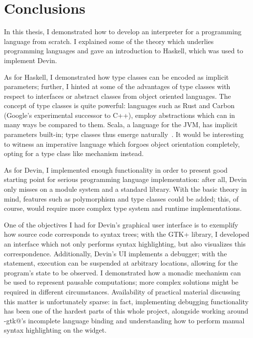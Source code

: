 \documentclass[UdineBachThesis,american,11pt]{PhdThesis}
\begin{document}
  \chapter{Conclusions}

  In this thesis, I demonstrated how to develop an interpreter for a programming
  language from scratch. I explained some of the theory which underlies
  programming languages and gave an introduction to Haskell, which was used
  to implement Devin.

  As for Haskell, I demonstrated how type classes can be encoded as implicit
  parameters; further, I hinted at some of the advantages of type classes with
  respect to interfaces or abstract classes from object oriented languages. The
  concept of type classes is quite powerful: languages such as Rust and Carbon
  (Google's experimental successor to C++), employ abstractions which can in
  many ways be compared to them. Scala, a language for the JVM, has implicit
  parameters built-in; type classes thus emerge
  naturally~\cite{scala-type-classes}. It would be interesting to witness an
  imperative language which forgoes object orientation completely, opting for a
  type class like mechanism instead.

  As for Devin, I implemented enough functionality in order to present good
  starting point for serious programming language implementation: after all,
  Devin only misses on a module system and a standard library. With the basic
  theory in mind, features such as polymorphism and type classes could be added;
  this, of course, would require more complex type system and runtime
  implementations.

  One of the objectives I had for Devin's graphical user interface is to
  exemplify how source code corresponds to syntax trees; with the GTK+ library,
  I developed an interface which not only performs syntax highlighting, but also
  visualizes this correspondence. Additionally, Devin's UI implements a
  debugger; with the \lstinline@breakpont@ statement, execution can be suspended
  at arbitrary locations, allowing for the program's state to be observed. I
  demonstrated how a monadic mechanism can be used to represent pausable
  computations; more complex solutions might be required in different
  circumstances. Availability of practical material discussing this matter is
  unfortunately sparse: in fact, implementing debugging functionality has been
  one of the hardest parts of this whole project, alongside working around
  \lstinline@gi-gtk@'s incomplete language binding and understanding how to
  perform manual syntax highlighting on the \lstinline@GtkSourceView@ widget.
\end{document}
